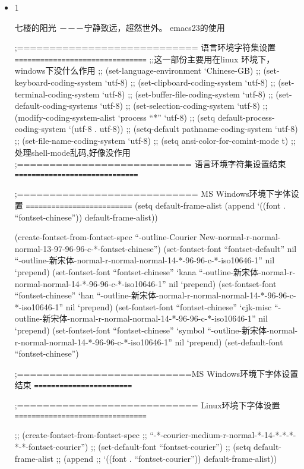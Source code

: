 \documentclass[11pt]{article}
\begin{document}
\begin{itemize}

\item 1\\
\label{sec-2.3.1}

七楼的阳光
－－－宁静致远，超然世外。
emacs23的使用


;============================ 语言环境字符集设置 \texttt{===============================}
;;这一部份主要用在linux 环境下，windows下没什么作用
;; (set-language-environment `Chinese-GB)
;; (set-keyboard-coding-system `utf-8)
;; (set-clipboard-coding-system `utf-8)
;; (set-terminal-coding-system `utf-8)
;; (set-buffer-file-coding-system `utf-8)
;; (set-default-coding-systems `utf-8)
;; (set-selection-coding-system `utf-8)
;; (modify-coding-system-alist `process ``*'' `utf-8)
;; (setq default-process-coding-system `(utf-8 . utf-8))
;; (setq-default pathname-coding-system `utf-8)
;; (set-file-name-coding-system `utf-8)
;; (setq ansi-color-for-comint-mode t) ;;处理shell-mode乱码,好像没作用
;=========================== 语言环境字符集设置结束 \texttt{=============================}

;============================ MS Windows环境下字体设置 \texttt{=========================}
(setq default-frame-alist 
(append 
  `((font . ``fontset-chinese'')) default-frame-alist))


(create-fontset-from-fontset-spec
  ``-outline-Courier New-normal-r-normal-normal-13-97-96-96-c-*-fontset-chinese'')
(set-fontset-font
 ``fontset-default'' nil
 ``-outline-新宋体-normal-r-normal-normal-14-*-96-96-c-*-iso10646-1'' nil `prepend)
(set-fontset-font
 ``fontset-chinese'' `kana
 ``-outline-新宋体-normal-r-normal-normal-14-*-96-96-c-*-iso10646-1'' nil `prepend)
(set-fontset-font
 ``fontset-chinese'' `han
 ``-outline-新宋体-normal-r-normal-normal-14-*-96-96-c-*-iso10646-1'' nil `prepend)
(set-fontset-font
 ``fontset-chinese'' `cjk-misc
 ``-outline-新宋体-normal-r-normal-normal-14-*-96-96-c-*-iso10646-1'' nil `prepend)
(set-fontset-font
 ``fontset-chinese'' `symbol
 ``-outline-新宋体-normal-r-normal-normal-14-*-96-96-c-*-iso10646-1'' nil `prepend)
(set-default-font ``fontset-chinese'')

;===========================MS Windows环境下字体设置结束 \texttt{=======================}

 

;============================ Linux环境下字体设置 \texttt{===============================}

;; (create-fontset-from-fontset-spec 
;; ``-*-courier-medium-r-normal-*-14-*-*-*-*-*-fontset-courier'') 
;; (set-default-font ``fontset-courier'') 
;; (setq default-frame-alist 
;; (append 
;; `((font . ``fontset-courier'')) default-frame-alist))


\end{itemize}
\end{document}
